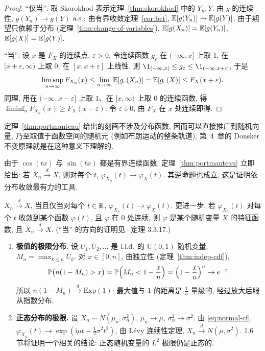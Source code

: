 \begin{proof}
``仅当'': 取 Skorokhod 表示定理~\ref{thm:skorokhod} 中的 $Y_n,Y$. 由 $g$ 的连续性, $g(Y_n)\to g(Y)$ $\as$; 由有界收敛定理~\ref{cor:bct}, $\E[g(Y_n)]\to\E[g(Y)]$. 由于期望只依赖于分布 (定理~\ref{thm:change-of-variables}), $\E[g(X_n)]=\E[g(Y_n)]$, $\E[g(X)]=\E[g(Y)]$.

``当'': 设 $x$ 是 $F_X$ 的连续点, $\varepsilon>0$. 令连续函数 $g_\varepsilon$ 在 $(-\infty,x]$ 上取 $1$, 在 $[x+\varepsilon,\infty)$ 上取 $0$, 在 $[x,x+\varepsilon]$ 上线性. 则 $\1_{(-\infty,x]}\le g_\varepsilon\le\1_{(-\infty,x+\varepsilon]}$, 于是
\[
\limsup_{n\to\infty}F_{X_n}(x)\le\lim_{n\to\infty}\E[g_\varepsilon(X_n)]=\E[g_\varepsilon(X)]\le F_X(x+\varepsilon).
\]
同理, 用在 $(-\infty,x-\varepsilon]$ 上取 $1$、在 $[x,\infty)$ 上取 $0$ 的连续函数, 得 $\liminf_n F_{X_n}(x)\ge F_X(x-\varepsilon)$. 令 $\varepsilon\downarrow0$, 由 $F_X$ 在 $x$ 处连续即得.
\end{proof}

\begin{remark}
定理~\ref{thm:portmanteau} 给出的刻画不涉及分布函数, 因而可以直接推广到随机向量, 乃至取值于函数空间的随机元 (例如布朗运动的整条轨道), 第~4~章的 Donsker 不变原理就是在这种意义下理解的.
\end{remark}

由于 $\cos(tx)$ 与 $\sin(tx)$ 都是有界连续函数, 定理~\ref{thm:portmanteau} 立即给出: 若 $X_n\xrightarrow{d}X$, 则对每个 $t$, $\varphi_{X_n}(t)\to\varphi_X(t)$. 其逆命题也成立, 这是证明依分布收敛最有力的工具.

\begin{theorem}\label{thm:levy-continuity}
$X_n\xrightarrow{d}X$, 当且仅当对每个 $t\in\R$, $\varphi_{X_n}(t)\to\varphi_X(t)$. 更进一步, 若 $\varphi_{X_n}(t)$ 对每个 $t$ 收敛到某个函数 $\varphi(t)$, 且 $\varphi$ 在 $0$ 处连续, 则 $\varphi$ 是某个随机变量 $X$ 的特征函数, 且 $X_n\xrightarrow{d}X$. (``当'' 的方向的证明见~\cite{durrett} 定理 3.3.17.)
\end{theorem}

\begin{example}\label{ex:conv-dist}
\begin{enumerate}
\item \textbf{极值的极限分布.} 设 $U_1,U_2,\dots$ 是 $\iid$ 的 $\mathrm{U}(0,1)$ 随机变量, $M_n=\max_{k\le n}U_k$. 对 $x\in[0,n]$, 由独立性 (定理~\ref{thm:indep-cdf}),
\[
\P\big(n(1-M_n)>x\big)=\P\Big(M_n<1-\frac{x}{n}\Big)=\Big(1-\frac{x}{n}\Big)^n\to e^{-x}.
\]
所以 $n(1-M_n)\xrightarrow{d}\mathrm{Exp}(1)$: 最大值与 $1$ 的距离是 $\frac{1}{n}$ 量级的, 经过放大后服从指数分布.
\item \textbf{正态分布的极限.} 设 $X_n\sim N(\mu_n,\sigma_n^2)$, $\mu_n\to\mu$, $\sigma_n^2\to\sigma^2$. 由 \eqref{eq:normal-cf}, $\varphi_{X_n}(t)\to\exp(\mathrm{i}\mu t-\frac{1}{2}\sigma^2t^2)$, 由 L\'evy 连续性定理, $X_n\xrightarrow{d}N(\mu,\sigma^2)$. 1.6 节将证明一个相关的结论: 正态随机变量的 $L^2$ 极限仍是正态的.
\end{enumerate}
\end{example}

